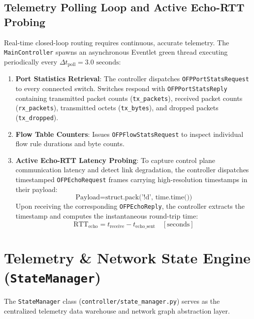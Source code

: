 \subsection{Telemetry Polling Loop and Active Echo-RTT Probing}
Real-time closed-loop routing requires continuous, accurate telemetry. The \texttt{MainController} spawns an asynchronous Eventlet green thread executing periodically every $\Delta t_{\text{poll}} = 3.0\text{ seconds}$:
\begin{enumerate}
    \item \textbf{Port Statistics Retrieval}: The controller dispatches \texttt{OFPPortStatsRequest} to every connected switch. Switches respond with \texttt{OFPPortStatsReply} containing transmitted packet counts (\texttt{tx\_packets}), received packet counts (\texttt{rx\_packets}), transmitted octets (\texttt{tx\_bytes}), and dropped packets (\texttt{tx\_dropped}).
    \item \textbf{Flow Table Counters}: Issues \texttt{OFPFlowStatsRequest} to inspect individual flow rule durations and byte counts.
    \item \textbf{Active Echo-RTT Latency Probing}: To capture control plane communication latency and detect link degradation, the controller dispatches timestamped \texttt{OFPEchoRequest} frames carrying high-resolution timestamps in their payload:
    \begin{equation}
        \text{Payload} = \text{struct.pack('!d', time.time())}
    \end{equation}
    Upon receiving the corresponding \texttt{OFPEchoReply}, the controller extracts the timestamp and computes the instantaneous round-trip time:
    \begin{equation}
        \text{RTT}_{\text{echo}} = t_{\text{receive}} - t_{\text{echo\_sent}} \quad [\text{seconds}]
    \end{equation}
\end{enumerate}

\section{Telemetry \& Network State Engine (\texttt{StateManager})}
The \texttt{StateManager} class (\texttt{controller/state\_manager.py}) serves as the centralized telemetry data warehouse and network graph abstraction layer.

